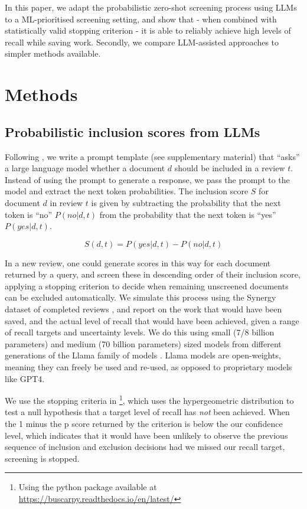 \documentclass{article}
\begin{document}
	In this paper, we adapt the probabilistic zero-shot screening process using LLMs to a ML-prioritised screening setting, and show that - when combined with statistically valid stopping criterion - it is able to reliably achieve high levels of recall while saving work. Secondly, we compare LLM-assisted approaches to simpler methods available.
	
	\section*{Methods}
	
	\subsection*{Probabilistic inclusion scores from LLMs}
	
	Following \cite{wang_zero-shot_2024}, we write a prompt template (see supplementary material) that ``asks'' a large language model whether a document $d$ should be included in a review $t$. Instead of using the prompt to generate a response, we pass the prompt to the model and extract the next token probabilities. The inclusion score $S$ for document $d$ in review $t$ is given by subtracting the probability that the next token is ``no'' $P(no|d,t)$ from the probability that the next token is ``yes'' $P(yes|d,t)$.
	
	\begin{equation}S(d,t) = P(yes|d,t) - P(no|d,t)\end{equation}
	
	In a new review, one could generate scores in this way for each document returned by a query, and screen these in descending order of their inclusion score, applying a stopping criterion to decide when remaining unscreened documents can be excluded automatically.  We simulate this process using the Synergy dataset of completed reviews \cite{de_bruin_synergy_2023}, and report on the work that would have been saved, and the actual level of recall that would have been achieved, given a range of recall targets and uncertainty levels. We do this using small (7/8 billion parameters) and medium (70 billion parameters) sized models from different generations of the Llama family of models \cite{touvron_llama_2023, dubey_llama_2024}. Llama models are open-weights, meaning they can freely be used and re-used, as opposed to proprietary models like GPT4.
	
	We use the stopping criteria in \cite{callaghan_statistical_2020}\footnote{Using the python package available at \url{https://buscarpy.readthedocs.io/en/latest/}}, which uses the hypergeometric distribution to test a null hypothesis that a target level of recall has \textit{not} been achieved. When the 1 minus the p score returned by the criterion is below the our confidence level, which indicates that it would have been unlikely to observe the previous sequence of inclusion and exclusion decisions had we missed our recall target, screening is stopped. 
	
\end{document}
